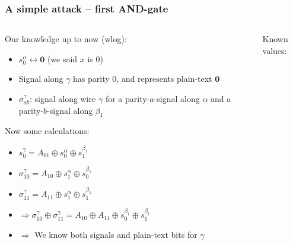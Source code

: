 \documentclass{beamer}
\begin{document}
\begin{frame}
  \frametitle{A simple attack -- first AND-gate}
  \begin{columns}
    \begin{column}{.75\textwidth}
      Our knowledge up to now (wlog):
      \begin{itemize}
      \item $s^\alpha_0\leftrightarrow \mathbf{0}$ (we said $x$ is 0)
      \item Signal along $\gamma$ has parity 0, and represents plain-text $\mathbf{0}$
      \item $\sigma^\gamma_{ab}$: signal along wire $\gamma$ for a parity-$a$-signal along $\alpha$ and a parity-$b$-signal along ${\beta_1}$
      \end{itemize}
      Now some calculations:
      \begin{itemize}
      \item<2-> $s_0^\gamma=A_{01}\oplus s_0^\alpha \oplus s_1^{\beta_1}$
      \item<4-> $\sigma_{10}^\gamma = A_{10} \oplus s_1^\alpha \oplus s_0^{\beta_1}$
      \item<4-> $\sigma_{11}^\gamma = A_{11} \oplus s_1^\alpha \oplus s_1^{\beta_1}$
      \item<4->$\Rightarrow \sigma_{10}^\gamma\oplus\sigma_{11}^\gamma = A_{10}\oplus A_{11} \oplus s_0^{\beta_1} \oplus s_1^{\beta_1}$
      \item<6->$\Rightarrow$ We know both signals and plain-text bits for $\gamma$
      \end{itemize}
    \end{column}
    \begin{column}{.25\textwidth}
      \begin{center}
      \end{center}      
      Known values:


      \vspace{.25cm}

      \vspace{.25cm}
      
    \end{column}
  \end{columns}
\end{frame}
\end{document}
